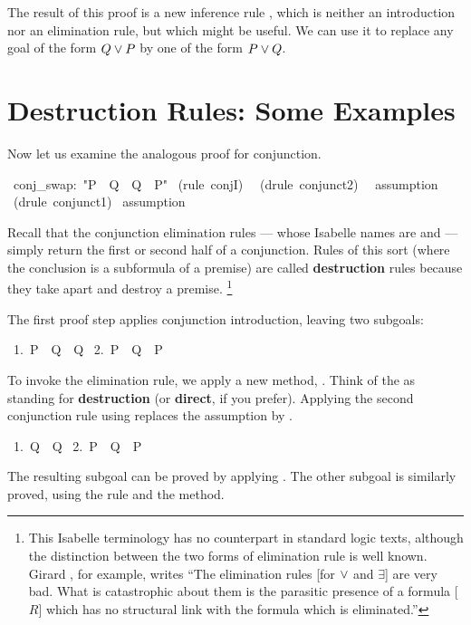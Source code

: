 The result of this proof is a new inference rule , which is neither 
an introduction nor an elimination rule, but which might 
be useful.  We can use it to replace any goal of the form $Q\vee P$
by one of the form $P\vee Q$.%


\section{Destruction Rules: Some Examples}

%
Now let us examine the analogous proof for conjunction. 
\begin{isabelle}
\ conj_swap:\ "P\ \isasymand\ Q\ \isasymLongrightarrow\ Q\ \isasymand\ P"\isanewline
{}\ (rule\ conjI)\isanewline
\ \ (drule\ conjunct2)\isanewline
\ \ assumption\isanewline
{}\ (drule\ conjunct1)\isanewline
{}\ assumption
\end{isabelle}
Recall that the conjunction elimination rules --- whose Isabelle names are 
 and  --- simply return the first or second half
of a conjunction.  Rules of this sort (where the conclusion is a subformula of a
premise) are called \textbf{destruction} rules because they take apart and destroy
a premise.%
\footnote{This Isabelle terminology has no counterpart in standard logic texts, 
although the distinction between the two forms of elimination rule is well known. 
Girard \cite[page 74]{girard89},
for example, writes ``The elimination rules 
[for $\vee$ and $\exists$] are very
bad.  What is catastrophic about them is the parasitic presence of a formula [$R$]
which has no structural link with the formula which is eliminated.''}

The first proof step applies conjunction introduction, leaving 
two subgoals: 
\begin{isabelle}
\ 1.\ P\ \isasymand\ Q\ \isasymLongrightarrow\ Q\isanewline
\ 2.\ P\ \isasymand\ Q\ \isasymLongrightarrow\ P
\end{isabelle}

To invoke the elimination rule, we apply a new method, . 
Think of the  as standing for \textbf{destruction} (or \textbf{direct}, if
you prefer).   Applying the 
second conjunction rule using  replaces the assumption 
 by . 
\begin{isabelle}
\ 1.\ Q\ \isasymLongrightarrow\ Q\isanewline
\ 2.\ P\ \isasymand\ Q\ \isasymLongrightarrow\ P
\end{isabelle}
The resulting subgoal can be proved by applying .
The other subgoal is similarly proved, using the  rule and the 
 method.

